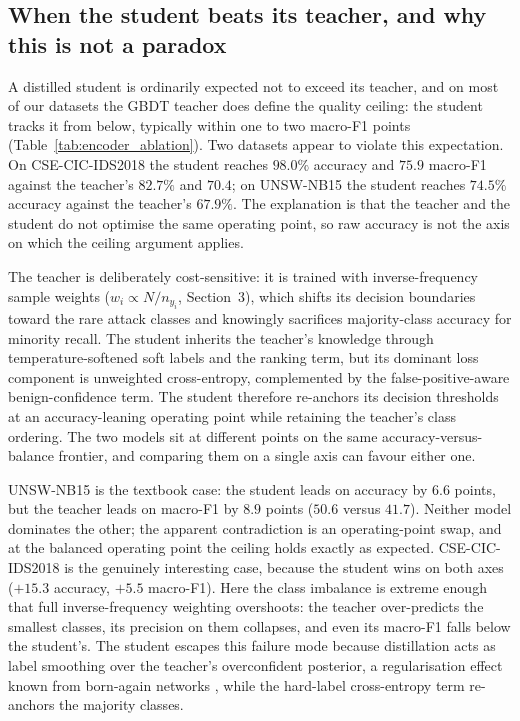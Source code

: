 \subsection{When the student beats its teacher, and why this is not a paradox}
\label{sec:student_vs_teacher}

A distilled student is ordinarily expected not to exceed its teacher, and on
most of our datasets the GBDT teacher does define the quality ceiling: the
student tracks it from below, typically within one to two macro-F1 points
(Table~\ref{tab:encoder_ablation}). Two datasets appear to violate this
expectation. On CSE-CIC-IDS2018 the student reaches $98.0\%$ accuracy and
$75.9$ macro-F1 against the teacher's $82.7\%$ and $70.4$; on UNSW-NB15 the
student reaches $74.5\%$ accuracy against the teacher's $67.9\%$. The
explanation is that the teacher and the student do not optimise the same
operating point, so raw accuracy is not the axis on which the ceiling
argument applies.

The teacher is deliberately cost-sensitive: it is trained with
inverse-frequency sample weights ($w_i \propto N / n_{y_i}$, Section~3),
which shifts its decision boundaries toward the rare attack classes and
knowingly sacrifices majority-class accuracy for minority recall. The
student inherits the teacher's knowledge through temperature-softened soft
labels and the ranking term, but its dominant loss component is unweighted
cross-entropy, complemented by the false-positive-aware benign-confidence
term. The student therefore re-anchors its decision thresholds at an
accuracy-leaning operating point while retaining the teacher's class
ordering. The two models sit at different points on the same
accuracy-versus-balance frontier, and comparing them on a single axis can
favour either one.

UNSW-NB15 is the textbook case: the student leads on accuracy by $6.6$
points, but the teacher leads on macro-F1 by $8.9$ points ($50.6$ versus
$41.7$). Neither model dominates the other; the apparent contradiction is an
operating-point swap, and at the balanced operating point the ceiling holds
exactly as expected. CSE-CIC-IDS2018 is the genuinely interesting case,
because the student wins on both axes ($+15.3$ accuracy, $+5.5$ macro-F1).
Here the class imbalance is extreme enough that full inverse-frequency
weighting overshoots: the teacher over-predicts the smallest classes, its
precision on them collapses, and even its macro-F1 falls below the
student's. The student escapes this failure mode because distillation acts
as label smoothing over the teacher's overconfident posterior, a
regularisation effect known from born-again networks \cite{furlanello2018},
while the hard-label cross-entropy term re-anchors the majority classes.

